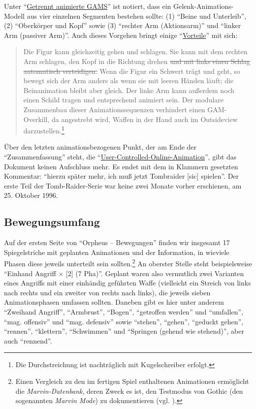 \documentclass[a5paper,pagesize,numbers=noenddot]{scrbook}
\begin{document}
Unter \enquote{\uline{Getrennt animierte GAMS}} ist notiert, dass ein Gelenk-Animations-Modell aus vier einzelnen Segmenten bestehen sollte: (1) \enquote{Beine und Unterleib}, (2) \enquote{Oberkörper und Kopf} sowie (3) \enquote{rechter Arm (Aktionsarm)} und \enquote{linker Arm (passiver Arm)}.
Auch dieses Vorgehen bringt einige \enquote{\uline{Vorteile}} mit sich:

\begin{quote}
   Die Figur kann gleichzeitig gehen und schlagen.
   Sie kann mit dem rechten Arm schlagen, den Kopf in die Richtung drehen \sout{und mit links einen Schlag automatisch verteidigen.}
   Wenn die Figur ein Schwert trägt und geht, so bewegt sich der Arm anders als wenn sie mit leeren Händen läuft; die Beinanimation bleibt aber gleich.
   Der linke Arm kann außerdem noch einen Schild tragen und entsprechend animiert sein.
   Der modulare Zusammenbau dieser Animationssequenzen verhindert einen GAM-Overkill, da angestrebt wird, Waffen in der Hand auch im Outsideview darzustellen.\footnote{Die Durchstreichung ist nachträglich mit Kugelschreiber erfolgt.}
\end{quote}

Über den letzten animationsbezogenen Punkt, der am Ende der \enquote{Zusammenfassung} steht, die \enquote{\uline{User-Controlled-Online-Animation}}, gibt das Dokument keinen Aufschluss mehr. %
Es endet mit dem in Klammern gesetzten Kommentar: \enquote{hierzu später mehr, ich muß jetzt Tombraider [sic] spielen}.
Der erste Teil der Tomb-Raider-Serie war keine zwei Monate vorher erschienen, am 25. Oktober 1996.


\subsection{Bewegungsumfang}\label{sec:orpheus_darstellung_bewegungsumfang}
Auf der ersten Seite von \enquote{Orpheus -- Bewegungen} finden wir insgesamt 17 Spiegelstriche mit geplanten Animationen und der Information, in wieviele Phasen diese jeweils unterteilt sein sollten.\footnote{Einen Vergleich zu den im fertigen Spiel enthaltenen Animationen ermöglicht die \textit{Marvin-Datenbank}, deren Zweck es ist, den Testmodus von Gothic (den sogenannten \textit{Marvin Mode}) zu dokumentieren (vgl. \autocite{sillus_marvin_2020}).}
An oberster Stelle steht beispielsweise \enquote{Einhand Angriff × [2] (7 Pha)}.
Geplant waren also vermutlich zwei Varianten eines Angriffs mit einer einhändig geführten Waffe (vielleicht ein Streich von links nach rechts und ein zweiter von rechts nach links), die jeweils sieben Animationsphasen umfassen sollten.
Daneben gibt es hier unter anderem \enquote{Zweihand Angriff}, \enquote{Armbrust}, \enquote{Bogen}, \enquote{getroffen werden} und \enquote{umfallen}, \enquote{mag. offensiv} und \enquote{mag. defensiv} sowie \enquote{stehen}, \enquote{gehen}, \enquote{geduckt gehen}, \enquote{rennen}, \enquote{klettern}, \enquote{Schwimmen} und \enquote{Springen (gehend wie stehend)}, aber auch \enquote{rennend}.
\end{document}
